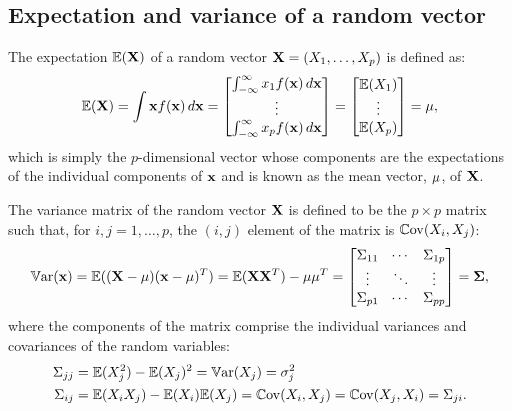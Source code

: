 \documentclass[10pt, a4paper]{article}
\begin{document}
\subsection{Expectation and variance of a random vector}

\begin{definition}
    The expectation $\mathbb{E}(\mathbf{X})$ of a random vector $\mathbf{X} = (X_1, \dotsc, X_p)$ is defined as:
    \[
    \mathbb{E}(\mathbf{X}) = \int\mathbf{x}f(\mathbf{x})\,d\mathbf{x} = \begin{bmatrix}
        \int_{-\infty}^{\infty}x_1f(\mathbf{x})\,d\mathbf{x} \\
        \vdots \\
        \int_{-\infty}^{\infty}x_pf(\mathbf{x})\,d\mathbf{x}
    \end{bmatrix} = \begin{bmatrix}
        \mathbb{E}(X_1) \\ \vdots \\ \mathbb{E}(X_p)
    \end{bmatrix} = \mathbf{\mu},
    \]
    which is simply the $p$-dimensional vector whose components are the expectations of the individual components of $\mathbf{x}$ and is known as the mean vector,
    $\mathbf{\mu}$,
    of $\mathbf{X}$.
\end{definition}

\begin{definition}
    The variance matrix of the random vector $\mathbf{X}$ is defined to be the $p \times p$ matrix such that,
    for $i, j = 1, \dotsc, p$,
    the $(i, j)$ element of the matrix is $\mathbb{C}\mathrm{ov}(X_i, X_j)$:
    \[
    \mathbb{V}\mathrm{ar}(\mathbf{x}) = \mathbb{E}((\mathbf{X} - \mathbf{\mu})(\mathbf{x} - \mathbf{\mu}) ^ T) = \mathbb{E}(\mathbf{X}\mathbf{X} ^ T) - \mathbf{\mu}\mathbf{\mu} ^ T = \begin{bmatrix}
        \Sigma_{11} & \dotsi & \Sigma_{1p} \\
        \vdots & \ddots & \vdots \\
        \Sigma_{p1} & \dotsi & \Sigma_{pp}
    \end{bmatrix} = \mathbf{\Sigma},
    \]
    where the components of the matrix comprise the individual variances and covariances of the random variables:
    \begin{align*}
        \Sigma_{jj} &= \mathbb{E}(X_j ^ 2) - \mathbb{E}(X_j) ^ 2 = \mathbb{V}\mathrm{ar}(X_j) = \sigma_j ^ 2 \\
        \Sigma_{ij} &= \mathbb{E}(X_iX_j) - \mathbb{E}(X_i)\mathbb{E}(X_j) = \mathbb{C}\mathrm{ov}(X_i, X_j) = \mathbb{C}\mathrm{ov}(X_j, X_i) = \Sigma_{ji}.
    \end{align*}
\end{definition}
\end{document}
